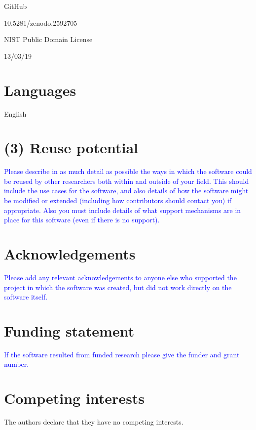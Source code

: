 \documentclass{jors}
\begin{document}
\begin{description}[noitemsep,topsep=0pt]
	\item[Name:] GitHub
	\item[Persistent identifier:] 10.5281/zenodo.2592705
	\item[Licence:] NIST Public Domain License~\cite{nistlicense}
	\item[Date published:] 13/03/19
\end{description}

\section*{Languages}

English

\section*{(3) Reuse potential}


\textcolor{blue}{Please describe in as much detail as possible the ways in which the software could be reused by other researchers both within and outside of your field. This should include the use cases for the software, and also details of how the software might be modified or extended (including how contributors should contact you) if appropriate. Also you must include details of what support mechanisms are in place for this software (even if there is no support).}

\section*{Acknowledgements}

\textcolor{blue}{Please add any relevant acknowledgements to anyone else who supported the project in which the software was created, but did not work directly on the software itself.}

\section*{Funding statement}

\textcolor{blue}{If the software resulted from funded research please give the funder and grant number.}

\section*{Competing interests}

The authors declare that they have no competing interests.
\end{document}
